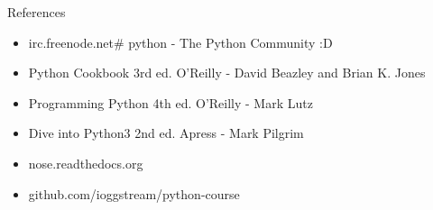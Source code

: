\begin{pyframe}{References}
\begin{itemize}
\item irc.freenode.net\# python - The Python Community :D
\item Python Cookbook 3rd ed. O'Reilly - David Beazley and Brian K. Jones
\item Programming Python 4th ed. O'Reilly - Mark Lutz
\item Dive into Python3 2nd ed. Apress - Mark Pilgrim
\item nose.readthedocs.org
\item github.com/ioggstream/python-course
\end{itemize}
\end{pyframe}
